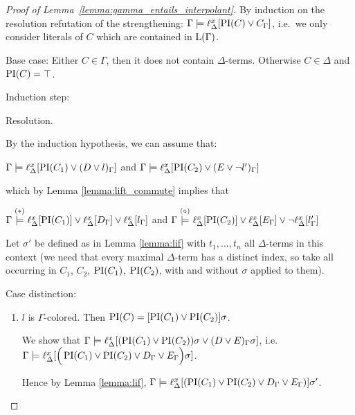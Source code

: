\begin{proof}[Proof of Lemma~\ref{lemma:gamma_entails_interpolant}]
	By induction on the resolution refutation of the strengthening: $\Gamma \entails \lifdelta{\PI(C) \lor\nolinebreak C_\Gamma}$, i.e.\ we only consider literals of $C$ which are contained in $\operatorname{L}(\Gamma)$.

	Base case:
	Either $C \in \Gamma$, then it does not contain $\Delta$-terms.
	Otherwise $C \in \Delta$ and $\operatorname{PI}(C) = \top$.

	Induction step:
	\begin{description}
		\item{Resolution.}
			\begin{prooftree}
			\end{prooftree}

			By the induction hypothesis, we can assume that:

			$\Gamma \models \ell_{\Delta}^{x}[\operatorname{PI}(C_1) \lor (D\lor l)_\Gamma]$ and $\Gamma \models \ell_{\Delta}^{x}[\operatorname{PI}(C_2) \lor (E\lor \lnot l')_\Gamma]$

			which by Lemma \ref{lemma:lift_commute} implies that

			$\Gamma \stackrel{(*)}{\models} \ell_{\Delta}^{x}[\operatorname{PI}(C_1)] \lor \ell_{\Delta}^{x}[D_\Gamma] \lor \ell_{\Delta}^{x}[l_\Gamma]$ and $\Gamma \stackrel{(\circ)}{\models} \ell_{\Delta}^{x}[\operatorname{PI}(C_2)] \lor \ell_{\Delta}^{x}[E_\Gamma] \lor \lnot \ell_{\Delta}^{x}[l'_\Gamma]$

			Let $\sigma'$ be defined as in Lemma \ref{lemma:lif} with $t_1, \ldots, t_n$ all $\Delta$-terms in this context (we need that every maximal $\Delta$-term has a distinct index, so take all occurring in $C_1$, $C_2$, $\operatorname{PI}(C_1)$, $\operatorname{PI}(C_2)$, with and without $\sigma$ applied to them).

			Case distinction:

			\begin{enumerate}
				\item $l$ is $\Gamma$-colored.
					Then $\operatorname{PI}(C) = [\operatorname{PI}(C_1) \lor \operatorname{PI}(C_2)]\sigma$. 

					We show that $\Gamma \models \ell_{\Delta}^{x}[ (\operatorname{PI}(C_1) \lor \operatorname{PI}(C_2))\sigma \lor (D \lor E)_\Gamma\sigma]$,
					\newline 
					i.e.~$\Gamma \models \ell_{\Delta}^{x}[ \Big(\operatorname{PI}(C_1) \lor \operatorname{PI}(C_2) \lor D_\Gamma \lor E_\Gamma\Big)\sigma] $.


					Hence by Lemma \ref{lemma:lif},
					$\Gamma \models \ell_{\Delta}^{x}[(\operatorname{PI}(C_1) \lor \operatorname{PI}(C_2) \lor D_\Gamma \lor E_\Gamma)]\sigma' $.


\end{enumerate}
\end{description}
\end{proof}
